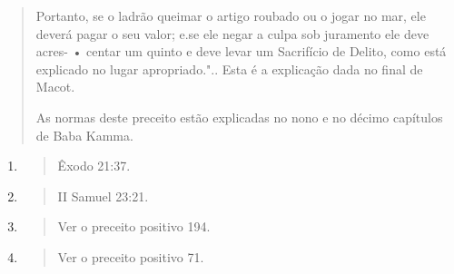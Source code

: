 \begin{quote}
Portanto, se o ladrão queimar o artigo roubado ou o jogar no mar, ele
deverá pagar o seu valor; e.se ele negar a culpa sob juramento ele deve
acres- • centar um quinto e deve levar um Sacrifício de Delito, como
está explicado no lugar
apropriado.".. Esta é a explicação
dada no final de Macot.

As normas deste preceito estão explicadas no nono e no décimo ca­pítulos
de Baba Kamma.
\end{quote}

\begin{enumerate}
\def\labelenumi{\arabic{enumi}.}
\setcounter{enumi}{402}
\item
 \begin{quote}
 Êxodo 21:37.
 \end{quote}
\item
 \begin{quote}
 II Samuel 23:21.
 \end{quote}
\item
 \begin{quote}
 Ver o preceito positivo 194.
 \end{quote}
\item
 \begin{quote}
 Ver o preceito positivo 71.
 \end{quote}
\end{enumerate}


